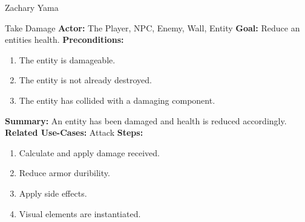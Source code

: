 \documentclass[12pt]{report}
\begin{document}
\begin{section}{Zachary Yama}
\begin{subsection}{Take Damage}
\textbf{Actor:} The Player, NPC, Enemy, Wall, Entity
\textbf{Goal:} Reduce an entities health.
\textbf{Preconditions:}
\begin{enumerate}
	\item The entity is damageable.
	\item The entity is not already destroyed.
	\item The entity has collided with a damaging component.
\end{enumerate}
\textbf{Summary:} An entity has been damaged and health is reduced accordingly.
\textbf{Related Use-Cases:} Attack
\textbf{Steps:}
\begin{enumerate}
	\item Calculate and apply damage received.
	\item Reduce armor duribility.
	\item Apply side effects.
	\item Visual elements are instantiated.
\end{enumerate}
\end{subsection}

\end{section}
\end{document}
